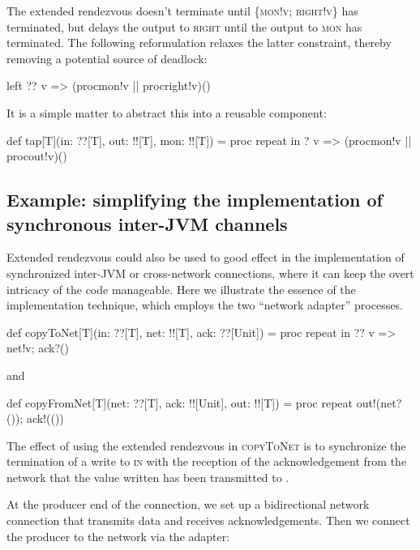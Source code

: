 \documentclass[12pt]{IOS-Book-Article-CPA-2017}
\begin{document}
The extended rendezvous doesn't terminate until \textsc{\{mon!v; right!v\}}
has terminated, but delays the output to \textsc{right} until
the output to \textsc{mon} has terminated. The following reformulation
relaxes the latter  constraint, thereby removing a potential source of
deadlock:
\begin{code+}[...]{}
    { left ?? { v => {(proc{mon!v} || proc{right!v})()} } }
\end{code+}

\noindent It is a simple matter to abstract this into a reusable component:
\begin{code+}[...]{}
    def tap[T](in: ??[T], out: !![T], mon: !![T]) =
        proc
        { repeat { in ? { v => {(proc{mon!v} || proc{out!v})()} } } }
\end{code+}

\subsection{Example: simplifying the implementation of synchronous inter-JVM channels}

Extended rendezvous could also be used to good effect in the
implementation of synchronized inter-JVM or cross-network connections,
where it can keep the overt intricacy of the code manageable. Here we
illustrate the essence of the implementation technique, which employs
the two ``network adapter'' processes.

\begin{code*}[netstuff.scala]
import io.threadcso._
object netstuff
{
\end{code*}
\begin{code+}{}
    def copyToNet[T](in: ??[T], net: !![T], ack: ??[Unit]) =
        proc { repeat { in ?? { v => { net!v; ack?() } } } }
\end{code+}
and
\begin{code+}{}
    def copyFromNet[T](net: ??[T], ack: !![Unit], out: !![T]) =
        proc { repeat { out!(net?()); ack!(()) } }
\end{code+}

The effect of using the extended rendezvous in \textsc{copyToNet}
is to synchronize the termination of a write to \textsc{in} with
the reception of the acknowledgement from the network that the
value written has been transmitted to . 


At the producer end of the connection, we set up a bidirectional
network connection that transmits data and receives 
acknowledgements. Then we connect the producer to the
network via the adapter:
\end{document}
